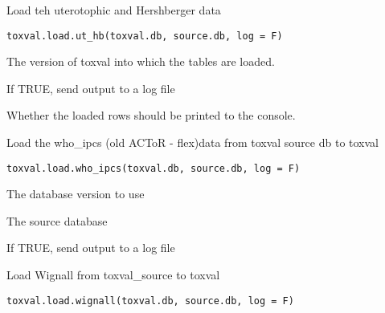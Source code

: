 \documentclass[letterpaper]{book}
\begin{document}
%
\begin{Description}\relax
Load teh uterotophic and Hershberger data
\end{Description}
%
\begin{Usage}
\begin{verbatim}
toxval.load.ut_hb(toxval.db, source.db, log = F)
\end{verbatim}
\end{Usage}
%
\begin{Arguments}
\begin{ldescription}
\item[\code{toxval.db}] The version of toxval into which the tables are loaded.

\item[\code{log}] If TRUE, send output to a log file

\item[\code{verbose}] Whether the loaded rows should be printed to the console.
\end{ldescription}
\end{Arguments}
%
\begin{Description}\relax
Load the who\_ipcs (old ACToR - flex)data  from toxval source db to toxval
\end{Description}
%
\begin{Usage}
\begin{verbatim}
toxval.load.who_ipcs(toxval.db, source.db, log = F)
\end{verbatim}
\end{Usage}
%
\begin{Arguments}
\begin{ldescription}
\item[\code{toxval.db}] The database version to use

\item[\code{source.db}] The source database

\item[\code{log}] If TRUE, send output to a log file
\end{ldescription}
\end{Arguments}
%
\begin{Description}\relax
Load Wignall from toxval\_source to toxval
\end{Description}
%
\begin{Usage}
\begin{verbatim}
toxval.load.wignall(toxval.db, source.db, log = F)
\end{verbatim}
\end{Usage}
\end{document}
